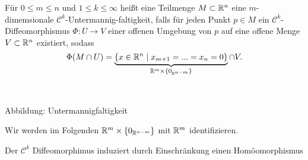 \begin{definition}\begin{mdframed}
Für $0 \leq m \leq n $ und \newline $1 \leq k \leq \infty$ heißt eine Teilmenge $M\subset \mathbb{R}^n$ eine $m$-dimemsionale $\mathcal{C}^k$-Untermannig-faltigkeit, falls für jeden Punkt $p\in M$ ein $\mathcal{C}^k$-Diffeomorphismus $\Phi:U\to V$ einer offenen Umgebung von $p$ auf eine offene Menge $V\subset \mathbb{R}^n$ existiert, sodass %
\begin{equation}
\Phi(M\cap U) =\underbrace{ \{x\in \mathbb{R}^n \mid x_{m+1}=...=x_n=0\}}_{\mathbb{R}^m\times\{0_{\mathbb{R}^{n-m}}\}}\cap V.
\end{equation}
\begin{center}\ \ \ \ \ \ \ \ \ \ \ 

\begin{small}
Abbildung: Untermannigfaltigkeit 
\end{small}
\end{center}
\end{mdframed}
Wir werden im Folgenden $\mathbb{R}^m\times \{0_{\mathbb{R}^{n-m}}\}$ mit $\mathbb{R}^m$ identifizieren.
\end{definition}
Der $\mathcal{C}^k$ Diffeomorphimus induziert durch Einschränkung einen Homöomorphismus

